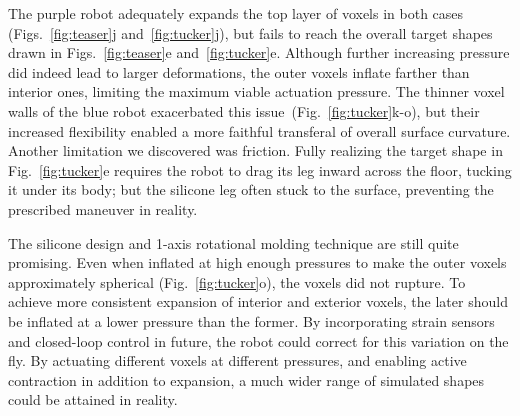 

The purple robot adequately expands the top layer of voxels in both cases (Figs.~\ref{fig:teaser}j and~\ref{fig:tucker}j), but fails to reach the overall target shapes drawn in Figs.~\ref{fig:teaser}e and~\ref{fig:tucker}e. 
Although further increasing pressure did indeed lead to larger deformations,
the outer voxels inflate farther than interior ones, limiting the maximum viable actuation pressure. 
The thinner voxel walls of the blue robot exacerbated this issue~\mbox{(Fig.~\ref{fig:tucker}k-o)}, 
but their increased flexibility enabled a more faithful transferal of overall surface curvature.
Another limitation we discovered was friction.
Fully realizing the target shape in Fig.~\ref{fig:tucker}e requires the robot to drag its leg inward across the floor, tucking it under its body; but the silicone leg often stuck to the surface, preventing the prescribed maneuver in reality.


The silicone design and 1-axis rotational molding technique are still quite promising. 
Even when inflated at high enough pressures to make the outer voxels approximately spherical (Fig.~\ref{fig:tucker}o), the voxels did not rupture. 
To achieve more consistent expansion of interior and exterior voxels, the later should be inflated at a lower pressure than the former.
By incorporating strain sensors \cite{white_low-cost_2017} and closed-loop control in future, the robot could correct for this variation on the fly.
By actuating different voxels at different pressures, and enabling active contraction in addition to expansion, a much wider range of simulated shapes could be attained in reality. 

